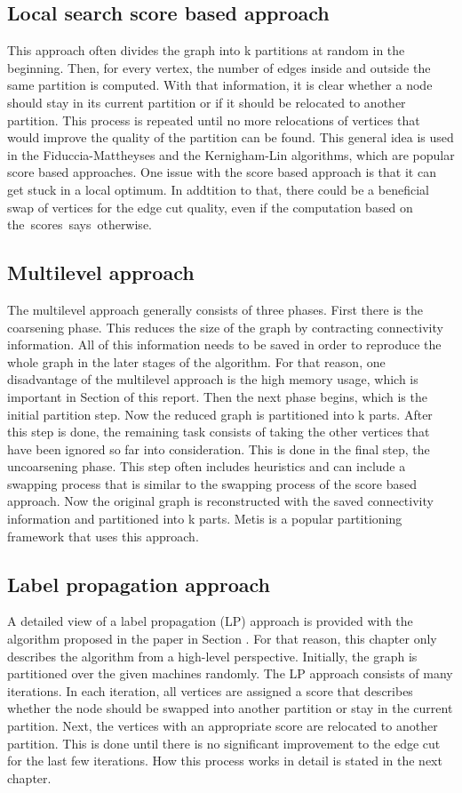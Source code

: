 \documentclass[acmsmall,nonacm,screen,review]{acmart}
\begin{document}
\subsection{Local search score based approach}
This approach often divides the graph into k partitions at random in the beginning. Then, for every vertex, the number of edges inside and outside the same partition is computed. With that information, it is clear whether a node should stay in its current partition or if it should be relocated to another partition. This process is repeated until no more relocations of vertices that would improve the quality of the partition can be found. This general idea is used in the Fiduccia-Mattheyses \cite{FM} and the Kernigham-Lin \cite{KL} algorithms, which are popular score based approaches. One issue with the score based approach is that it can get stuck in a local optimum. In addtition to that, there could be a beneficial swap of vertices for the edge cut quality, even if the computation based on \hbox{the scores says otherwise.}
\subsection{Multilevel approach}
The multilevel approach generally consists of three phases. First there is the coarsening phase. This reduces the size of the graph by contracting connectivity information. All of this information needs to be saved in order to reproduce the whole graph in the later stages of the algorithm. For that reason, one disadvantage of the multilevel approach is the high memory usage, which is important in Section  of this report. Then the next phase begins, which is the initial partition step. Now the reduced graph is partitioned into k parts. After this step is done, the remaining task consists of taking the other vertices that have been ignored so far into consideration. This is done in the final step, the uncoarsening phase. This step often includes heuristics and can include a swapping process that is similar to the swapping process of the score based approach. Now the original graph is reconstructed with the saved connectivity information and partitioned into k parts. Metis \cite{Metis} is a popular partitioning framework that uses this approach.
\subsection{Label propagation approach}
A detailed view of a label propagation (LP) approach is provided with the algorithm proposed in the paper \cite{Main} in Section . For that reason, this chapter only describes the algorithm from a high-level perspective. Initially, the graph is partitioned over the given machines randomly. The LP approach consists of many iterations. In each iteration, all vertices are assigned a score that describes whether the node should be swapped into another partition or stay in the current partition. Next, the vertices with an appropriate score are relocated to another partition. This is done until there is no significant improvement to the edge cut for the last few iterations. How this process works in detail is stated in the next chapter.
\end{document}
